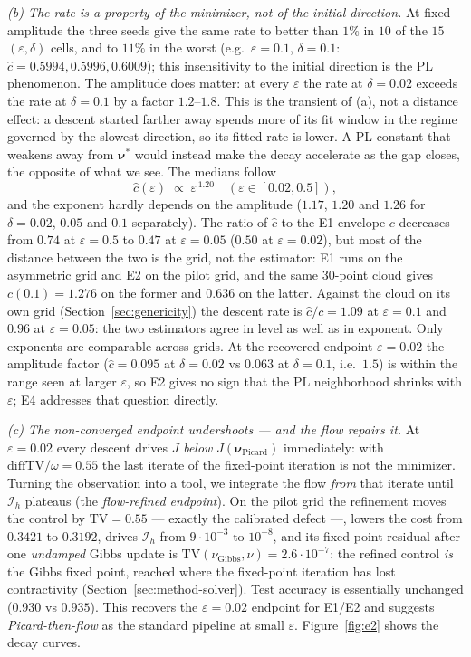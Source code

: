 \documentclass[11pt,leqno]{amsart}
\newcommand{\cI}{\mathcal{I}}
\newcommand{\bnu}{\boldsymbol{\nu}}
\newcommand{\eps}{\varepsilon}
\newcommand{\TV}{\mathrm{TV}}
\numberwithin{equation}{section}
\theoremstyle{definition}
\begin{document}
\emph{(b) The rate is a property of the minimizer, not of the initial
direction.}  At fixed amplitude the three seeds give the same rate to
better than $1\%$ in $10$ of the $15$ $(\eps,\delta)$ cells, and to $11\%$
in the worst (e.g.\ $\eps=0.1$, $\delta=0.1$: $\hat c=0.5994,0.5996,0.6009$);
this insensitivity to the initial direction is the PL phenomenon.  The
amplitude does matter: at every $\eps$ the rate at $\delta=0.02$ exceeds
the rate at $\delta=0.1$ by a factor $1.2$--$1.8$.  This is the transient
of (a), not a distance effect: a descent started farther away spends more
of its fit window in the regime governed by the slowest direction, so its
fitted rate is lower.  A PL constant that weakens away from $\bnu^*$ would
instead make the decay accelerate as the gap closes, the opposite of what
we see.  The medians follow
\begin{equation}
\hat c(\eps)\;\propto\;\eps^{\,1.20}\quad(\eps\in[0.02,0.5]),
\end{equation}
and the exponent hardly depends on the amplitude ($1.17$, $1.20$ and $1.26$
for $\delta=0.02$, $0.05$ and $0.1$ separately).  The ratio of $\hat c$ to
the E1 envelope $c$ decreases from $0.74$ at $\eps=0.5$ to $0.47$ at
$\eps=0.05$ ($0.50$ at $\eps=0.02$), but most of the distance between the
two is the grid, not the estimator: E1 runs on the asymmetric grid and E2
on the pilot grid, and the same $30$-point cloud gives $c(0.1)=1.276$ on
the former and $0.636$ on the latter.  Against the cloud on its own grid
(Section~\ref{sec:genericity}) the descent rate is $\hat c/c=1.09$ at
$\eps=0.1$ and $0.96$ at $\eps=0.05$: the two estimators agree in level as
well as in exponent.  Only exponents are comparable across grids.  At the recovered endpoint $\eps=0.02$ the amplitude
factor ($\hat c=0.095$ at $\delta=0.02$ vs $0.063$ at $\delta=0.1$, i.e.\
$1.5$) is within the range seen at larger $\eps$, so E2 gives no sign that
the PL neighborhood shrinks with $\eps$; E4 addresses that question
directly.

\emph{(c) The non-converged endpoint undershoots --- and the flow repairs
it.}  At $\eps=0.02$ every descent drives $J$ \emph{below}
$J(\bnu_{\mathrm{Picard}})$ immediately: with $\mathrm{diffTV}/\omega=0.55$
the last iterate of the fixed-point iteration is not the minimizer.  Turning
the observation into a tool, we integrate the flow \emph{from} that iterate
until $\cI_h$ plateaus (the \emph{flow-refined endpoint}).  On the pilot
grid the refinement moves the control by $\TV=0.55$ --- exactly the
calibrated defect ---, lowers the cost from $0.3421$ to $0.3192$, drives
$\cI_h$ from $9\cdot10^{-3}$ to $10^{-8}$, and its fixed-point residual
after one \emph{undamped} Gibbs update is
$\TV(\nu_{\mathrm{Gibbs}},\nu)=2.6\cdot10^{-7}$: the refined control
\emph{is} the Gibbs fixed point, reached where the fixed-point iteration has
lost contractivity (Section~\ref{sec:method-solver}).  Test accuracy is
essentially unchanged ($0.930$ vs $0.935$).  This recovers the $\eps=0.02$
endpoint for E1/E2 and suggests \emph{Picard-then-flow} as the standard
pipeline at small $\eps$.  Figure~\ref{fig:e2} shows the decay curves.
\end{document}
